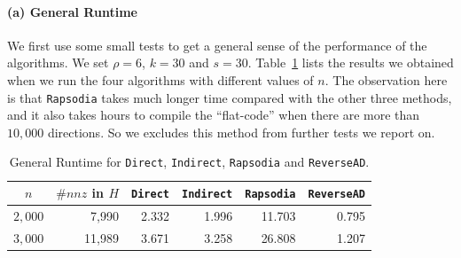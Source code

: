 \documentclass[final,leqno,onefignum,onetabnum]{siamart}
\begin{document}
\paragraph{(a) General Runtime} We first use some small tests to get a general sense of the performance of the algorithms. We set $\rho = 6$, $k = 30$ and $s = 30$. 
Table~\ref{tab:general} lists the results we obtained when
we run the four algorithms with different values of $n$.  The observation here is that
{\tt Rapsodia} takes much longer time compared with the other three methods, and it also takes hours to compile the ``flat-code'' when there are more than $10,000$ directions. 
So we excludes this method from further tests we report on.
\begin{table}[htbp]
\begin{center}
\begin{tabular}{ | c | r | r | r | r | r |}
\hline
$n$ & $\#nnz$ in $H$ & {\tt Direct} & {\tt Indirect} & {\tt Rapsodia} & {\tt ReverseAD} \\
\hline
$2,000$ & 7,990 & 2.332 & 1.996 & 11.703 & 0.795 \\
$3,000$ & 11,989 & 3.671 & 3.258 & 26.808 & 1.207\\
\hline 
\end{tabular}
\end{center}
\caption{General Runtime for {\tt Direct}, {\tt Indirect}, {\tt Rapsodia} and {\tt ReverseAD}.}
\label{tab:general}
\end{table}
\end{document}
